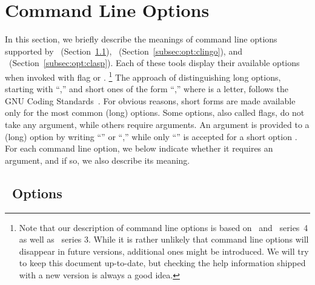 \section{Command Line Options}\label{sec:options}

In this section, we briefly describe the meanings of
command line options supported by
\gringo\ (Section~\ref{subsec:opt:gringo}),
\clingo\ (Section~\ref{subsec:opt:clingo}), and
\clasp\ (Section~\ref{subsec:opt:clasp}).
Each of these tools display their available options
when invoked with flag  or .%
\footnote{%
  Note that our description of command line options
  is based on \gringo\ and \clingo\ series~4
  as well as \clasp\ series 3.
  While it is rather unlikely that command line options will
  disappear in future versions,
  additional ones might be introduced.
  We will try to keep this document up-to-date,
  but checking the help information shipped 
  with a new version is always a good idea.}
The approach of distinguishing long options, starting with ``\code{--},''
and short ones of the form ``,''
where  is a letter,
follows the GNU Coding Standards~\cite{GNUcoding}.
For obvious reasons,
short forms are made available only for the most common (long) options.
Some options, also called flags, do not take any argument,
while others require arguments.
An argument  is provided to a (long) option 
by writing 
``'' or
``,''
while only
``''
is accepted for a short option .
For each command line option,
we below indicate whether it requires an argument,
and if so, we also describe its meaning.


\subsection{\gringo\ Options}\label{subsec:opt:gringo}

